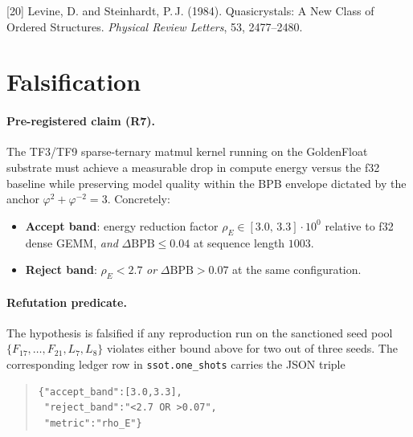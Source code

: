 [20] Levine, D. and Steinhardt, P.\,J. (1984).
Quasicrystals: A New Class of Ordered Structures.
\emph{Physical Review Letters}, 53, 2477--2480.~\cite{levine_steinhardt_1984}

\section{Falsification}
\label{sec:falsification:ch08}

\paragraph{Pre-registered claim (R7).}
The TF3/TF9 sparse-ternary matmul kernel running on the GoldenFloat substrate
must achieve a measurable drop in compute energy versus the f32 baseline while
preserving model quality within the BPB envelope dictated by the anchor
$\varphi^2 + \varphi^{-2} = 3$. Concretely:

\begin{itemize}
    \item \textbf{Accept band}: energy reduction factor
          $\rho_E \in [3.0,\,3.3] \cdot 10^{0}$ relative to f32 dense GEMM,
          \emph{and} $\Delta\mathrm{BPB} \le 0.04$ at sequence length $1003$.
    \item \textbf{Reject band}: $\rho_E < 2.7$ \emph{or}
          $\Delta\mathrm{BPB} > 0.07$ at the same configuration.
\end{itemize}

\paragraph{Refutation predicate.}
The hypothesis is falsified if any reproduction run on the sanctioned seed
pool $\{F_{17},\dots,F_{21},L_7,L_8\}$ violates either bound above for two
out of three seeds. The corresponding ledger row in
\texttt{ssot.one\_shots} carries the JSON triple
\begin{quote}\footnotesize
\begin{verbatim}
{"accept_band":[3.0,3.3],
 "reject_band":"<2.7 OR >0.07",
 "metric":"rho_E"}
\end{verbatim}
\end{quote}

